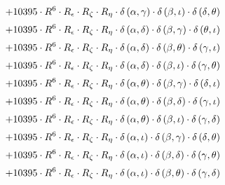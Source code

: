 \begin{subequations}
\begin{gather}
 \\[0.2em] \notag 		 + 10395 \cdot R^{6} \cdot R_{\epsilon{}} \cdot R_{\zeta{}} \cdot R_{\eta{}} \cdot \delta{}\left(\alpha{}, \gamma{}\right) \cdot \delta{}\left(\beta{}, \iota{}\right) \cdot \delta{}\left(\delta{}, \theta{}\right) 
 \\[0.2em] \notag 		 + 10395 \cdot R^{6} \cdot R_{\epsilon{}} \cdot R_{\zeta{}} \cdot R_{\eta{}} \cdot \delta{}\left(\alpha{}, \delta{}\right) \cdot \delta{}\left(\beta{}, \gamma{}\right) \cdot \delta{}\left(\theta{}, \iota{}\right) 
 \\[0.2em] \notag 		 + 10395 \cdot R^{6} \cdot R_{\epsilon{}} \cdot R_{\zeta{}} \cdot R_{\eta{}} \cdot \delta{}\left(\alpha{}, \delta{}\right) \cdot \delta{}\left(\beta{}, \theta{}\right) \cdot \delta{}\left(\gamma{}, \iota{}\right) 
 \\[0.2em] \notag 		 + 10395 \cdot R^{6} \cdot R_{\epsilon{}} \cdot R_{\zeta{}} \cdot R_{\eta{}} \cdot \delta{}\left(\alpha{}, \delta{}\right) \cdot \delta{}\left(\beta{}, \iota{}\right) \cdot \delta{}\left(\gamma{}, \theta{}\right) 
 \\[0.2em] \notag 		 + 10395 \cdot R^{6} \cdot R_{\epsilon{}} \cdot R_{\zeta{}} \cdot R_{\eta{}} \cdot \delta{}\left(\alpha{}, \theta{}\right) \cdot \delta{}\left(\beta{}, \gamma{}\right) \cdot \delta{}\left(\delta{}, \iota{}\right) 
 \\[0.2em] \notag 		 + 10395 \cdot R^{6} \cdot R_{\epsilon{}} \cdot R_{\zeta{}} \cdot R_{\eta{}} \cdot \delta{}\left(\alpha{}, \theta{}\right) \cdot \delta{}\left(\beta{}, \delta{}\right) \cdot \delta{}\left(\gamma{}, \iota{}\right) 
 \\[0.2em] \notag 		 + 10395 \cdot R^{6} \cdot R_{\epsilon{}} \cdot R_{\zeta{}} \cdot R_{\eta{}} \cdot \delta{}\left(\alpha{}, \theta{}\right) \cdot \delta{}\left(\beta{}, \iota{}\right) \cdot \delta{}\left(\gamma{}, \delta{}\right) 
 \\[0.2em] \notag 		 + 10395 \cdot R^{6} \cdot R_{\epsilon{}} \cdot R_{\zeta{}} \cdot R_{\eta{}} \cdot \delta{}\left(\alpha{}, \iota{}\right) \cdot \delta{}\left(\beta{}, \gamma{}\right) \cdot \delta{}\left(\delta{}, \theta{}\right) 
 \\[0.2em] \notag 		 + 10395 \cdot R^{6} \cdot R_{\epsilon{}} \cdot R_{\zeta{}} \cdot R_{\eta{}} \cdot \delta{}\left(\alpha{}, \iota{}\right) \cdot \delta{}\left(\beta{}, \delta{}\right) \cdot \delta{}\left(\gamma{}, \theta{}\right) 
 \\[0.2em] \notag 		 + 10395 \cdot R^{6} \cdot R_{\epsilon{}} \cdot R_{\zeta{}} \cdot R_{\eta{}} \cdot \delta{}\left(\alpha{}, \iota{}\right) \cdot \delta{}\left(\beta{}, \theta{}\right) \cdot \delta{}\left(\gamma{}, \delta{}\right) 

\end{gather}
\end{subequations}
